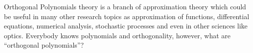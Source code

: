 \documentclass[portrait,final,a0paper,fontscale=0.38]{baposter}
\begin{document}
\begin{poster}
    \newcommand{\colouredcircle}{%
      \tikz{\useasboundingbox (-0.2em,-0.32em) rectangle(0.2em,0.32em); \draw[draw=black,fill=lightblue,line width=0.03em] (0,0) circle(0.18em);}}


  {

\begin{multicols}{2}

  Orthogonal Polynomials theory is a branch of approximation theory which could be useful in many other research topics as approximation of functions, differential equations, numerical analysis, stochastic processes and even in other sciences like optics. Everybody knows polynomials and orthogonality, however, what are ``orthogonal polynomials''?


\end{multicols}}
\end{poster}
\end{document}
